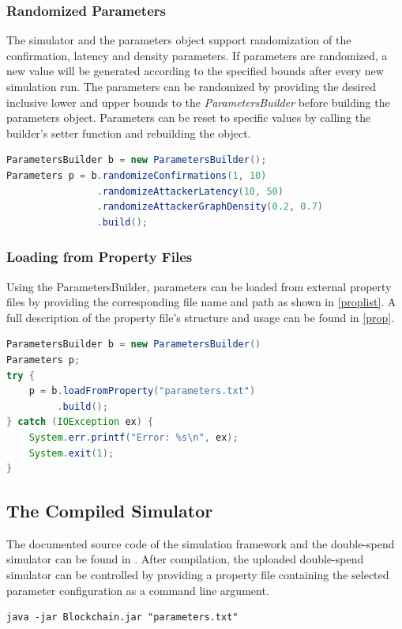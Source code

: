 \documentclass[a4paper,12pt,twoside]{report}
\begin{document}
\subsubsection{Randomized Parameters}
The simulator and the parameters object support randomization of the confirmation, latency and density parameters. If parameters are randomized, a new value will be generated according to the specified bounds after every new simulation run. The parameters can be randomized by providing the desired inclusive lower and upper bounds to the \textit{ParametersBuilder} before building the parameters object. Parameters can be reset to specific values by calling the builder's setter function and rebuilding the object.
\begin{lstlisting}[language=Java, caption=Randomizing parameters using the ParametersBuilder]
ParametersBuilder b = new ParametersBuilder();
Parameters p = b.randomizeConfirmations(1, 10)
                .randomizeAttackerLatency(10, 50)
                .randomizeAttackerGraphDensity(0.2, 0.7)
                .build();
\end{lstlisting}
\subsubsection{Loading from Property Files}
Using the ParametersBuilder, parameters can be loaded from external property files by providing the corresponding file name and path as shown in \autoref{proplist}. A full description of the property file's structure and usage can be found in \autoref{prop}.

\begin{lstlisting}[language=Java, caption=Loading parameters from property file,label=proplist]
ParametersBuilder b = new ParametersBuilder()
Parameters p;
try {
	p = b.loadFromProperty("parameters.txt")
	     .build();
} catch (IOException ex) {
	System.err.printf("Error: %s\n", ex);
	System.exit(1);
}
\end{lstlisting}
\subsection{The Compiled Simulator}
The documented source code of the simulation framework and the double-spend simulator can be found in \cite{github}. After compilation, the uploaded double-spend simulator can be controlled by providing a property file containing the selected parameter configuration as a command line argument.
\begin{lstlisting}[caption=Launching the simulator from the command line,label=cmd]
java -jar Blockchain.jar "parameters.txt"
\end{lstlisting}
\end{document}
